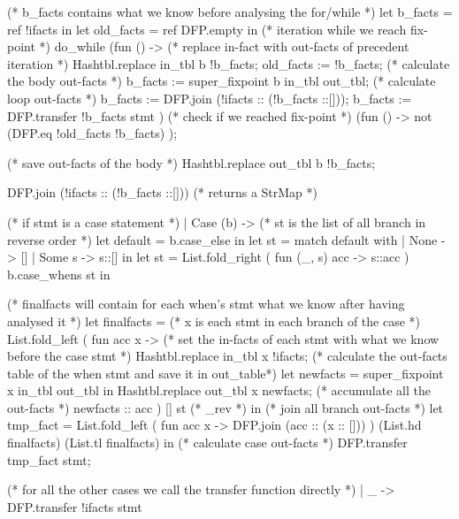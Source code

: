 \documentclass[a4paper]{article}   %
\begin{document}
\begin{ocaml}
    	(* b_facts contains what we know before analysing the for/while *)
    	let b_facts = ref !ifacts in
    	let old_facts = ref DFP.empty in
    	(* iteration while we reach fix-point *)
    	do_while (fun () -> 
    		(* replace in-fact with out-facts of precedent iteration *)
    		Hashtbl.replace in_tbl b !b_facts;
    		old_facts := !b_facts;
    		(* calculate the body out-facts *)
    		b_facts := super_fixpoint b in_tbl out_tbl;
    		(* calculate loop out-facts *)
    		b_facts := DFP.join (!ifacts :: (!b_facts ::[]));
    		b_facts := DFP.transfer !b_facts stmt )
    		(* check if we reached fix-point *)
    		(fun () -> not (DFP.eq !old_facts !b_facts) 
    	);
    
    	(* save out-facts of the body *)
      	Hashtbl.replace out_tbl b !b_facts;
    
      	DFP.join (!ifacts :: (!b_facts ::[]))	(* returns a StrMap *)
 
    (* if stmt is a case statement *)		
    | Case (b) ->
    	(* st is the list of all branch in reverse order *)
    	let default = b.case_else in
    	let st = match default with
    		| None -> []
    		| Some s -> s::[]
    	in
    	let st = List.fold_right ( fun (_, s) acc -> s::acc ) b.case_whens st in
    
    	(* finalfacts will contain for each when's stmt what we know after having analysed it *)
    	let finalfacts = 
    	(* x is each stmt in each branch of the case *)
    	List.fold_left ( fun acc x ->
    		(* set the in-facts of each stmt with what we know before the case stmt *)
    		Hashtbl.replace in_tbl x !ifacts;
    		(* calculate the out-facts table of the when stmt and save it in out_table*)
    		let newfacts = super_fixpoint x in_tbl out_tbl in
    		Hashtbl.replace out_tbl x newfacts;
    		(* accumulate all the out-facts *)
    		newfacts :: acc
    	) [] st (* _rev *)
    	in
    	(* join all branch out-facts *)	
    	let tmp_fact = List.fold_left ( fun acc x ->
            DFP.join (acc :: (x :: []))
    	) (List.hd finalfacts) (List.tl finalfacts) 
    	in
    	(* calculate case out-facts *)
    	DFP.transfer tmp_fact stmt;
		
	(* for all the other cases we call the transfer function directly *)
	| _ ->  
		DFP.transfer !ifacts stmt 
\end{ocaml}


\cleardoublepage
{}

\printbibliography
\end{document}
